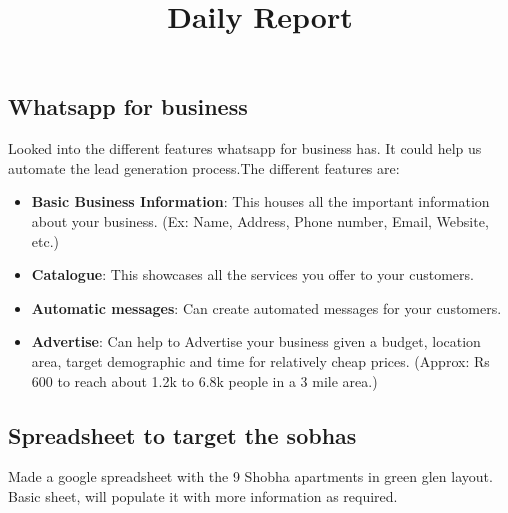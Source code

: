 \documentclass[12pt, a4paper]{article}
\begin{document}
\title{Daily Report}
\maketitle

\subsection{Whatsapp for business}

Looked into the different features whatsapp for business has. It could help us automate the lead generation process.The different features are:

\begin{itemize}
    \item \textbf{Basic Business Information}: This houses all the important information about your business. (Ex: Name, Address, Phone number, Email, Website, etc.)
    \item \textbf{Catalogue}: This showcases all the services you offer to your customers.
    \item \textbf{Automatic messages}: Can create automated messages for your customers.
    \item \textbf{Advertise}: Can help to Advertise your business given a budget, location area, target demographic and time for relatively cheap prices. (Approx: Rs 600 to reach about 1.2k to 6.8k people in a 3 mile area.)
\end{itemize}


\vspace{0.5cm}

\subsection{Spreadsheet to target the sobhas}

Made a google spreadsheet with the 9 Shobha apartments in green glen layout. Basic sheet, will populate it with more information as required.

\vspace{0.25cm}
\end{document}
